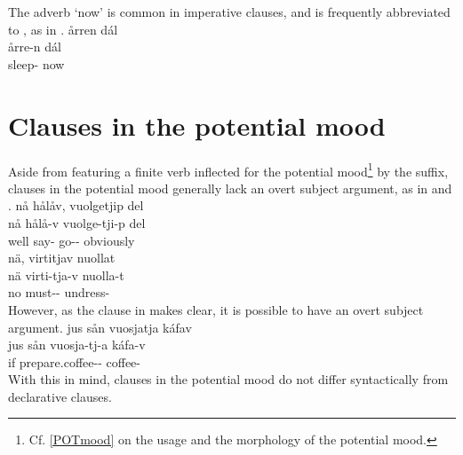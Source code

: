 The adverb  ‘now’ is common in imperative clauses, and is frequently abbreviated to , as in .
\ea\label{impClause5}
\glll	årren dál\\
	årre-n dál\\
	sleep- now\\\nopagebreak
{} 
\z


\section{Clauses in the potential mood}\label{potClauses}
Aside from featuring a finite verb inflected for the potential mood\footnote{Cf. \SEC\ref{POTmood} on the usage and the morphology of the potential mood.} by the  suffix, clauses in the potential mood generally lack an overt subject argument, as in %
 and . 
\ea\label{potSyntaxEx2}
\glll	nå hålåv, vuolgetjip del\\
	nå hålå-v vuolge-tji-p del\\
	well say- go-- obviously\\\nopagebreak
{}	
\z
\ea\label{potSyntaxEx3}
\glll	nä, virtitjav nuollat\\
	nä virti-tja-v nuolla-t\\
	no must-- undress-\\\nopagebreak
{}	
\z
However, as the clause in  makes clear, it is possible to have an overt subject argument. 
\ea\label{potSyntaxEx1}
\glll	jus sån vuosjatja káfav\\
	jus sån vuosja-tj-a káfa-v\\
	if  prepare.coffee-- coffee-\\\nopagebreak
{}	
\z
With this in mind, clauses in the potential mood do not differ syntactically from declarative clauses. %

